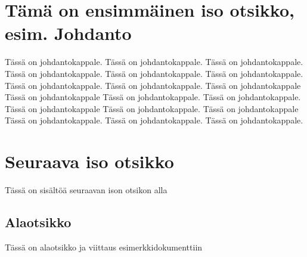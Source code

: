 \documentclass[a4paper]{article}
\begin{document}
\maketitle

\section{Tämä on ensimmäinen iso otsikko, esim. Johdanto}

Tässä on johdantokappale. Tässä on johdantokappale. Tässä on johdantokappale. Tässä on johdantokappale. Tässä on johdantokappale. Tässä on johdantokappale. Tässä on johdantokappale. Tässä on johdantokappale. Tässä on johdantokappale Tässä on johdantokappale Tässä on johdantokappale. Tässä on johdantokappale. Tässä on johdantokappale Tässä on johdantokappale. Tässä on johdantokappale Tässä on johdantokappale. Tässä on johdantokappale. Tässä on johdantokappale.

\section{Seuraava iso otsikko}

Tässä on sisältöä seuraavan ison otsikon alla

\subsection{Alaotsikko}

Tässä on alaotsikko ja viittaus esimerkkidokumenttiin \citep{koski2012}




\end{document}
